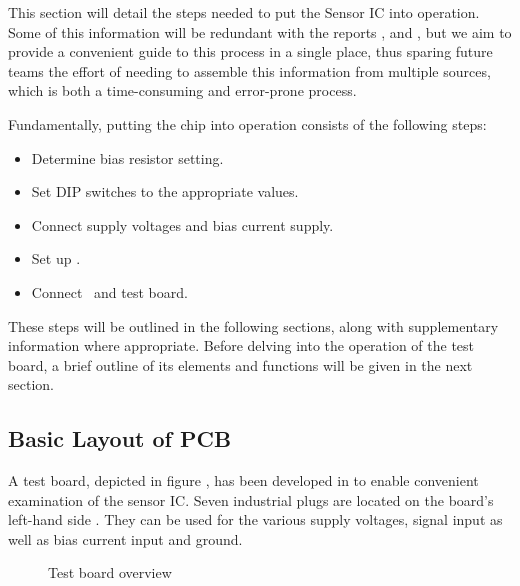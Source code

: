 This  section  will  detail  the  steps  needed to  put  the  Sensor  IC  into
operation. Some  of  this  information  will be  redundant  with  the  reports
\cite{ref:burgherr},  \cite{ref:gloor} and  \cite{ref:baier},  but  we aim  to
provide a  convenient guide to  this process in  a single place,  thus sparing
future teams the effort of needing  to assemble this information from multiple
sources, which is both a time-consuming and error-prone process.

Fundamentally, putting the chip into operation consists of the following steps:
\begin{itemize}\tightlist
    \item
        Determine bias resistor setting.
    \item
        Set DIP switches to the appropriate values.
    \item
        Connect supply voltages and bias current supply.
    \item
        Set up \raspi.
    \item
        Connect \raspi~and test board.
\end{itemize}

These  steps  will   be  outlined  in  the  following   sections,  along  with
supplementary information where appropriate. Before delving into the operation
of the test board, a brief outline of its elements and functions will be given
in the next section.

\subsection{Basic Layout of PCB}
\label{subsec:PCBLayout}

A test board, depicted in figure , has been developed in
 to enable convenient examination
of the sensor IC.  Seven industrial plugs are located on the board's left-hand
side . They  can be used for the  various supply voltages,
signal input as well as bias current input and ground.


\begin{figure}
    \centering
    
    \caption{Test board overview}
    \label{fig:pcbOverview}
\end{figure}

